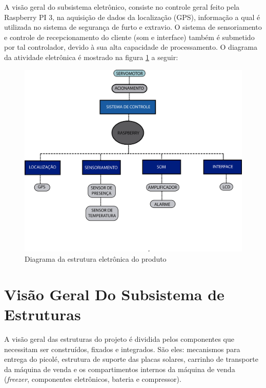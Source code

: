 A visão geral do subsistema eletrônico, consiste no controle geral feito pela Raspberry PI 3, na aquisição de dados da localização (GPS), informação a qual é utilizada no sistema de segurança de furto e extravio. O sistema de sensoriamento e controle de recepcionamento do cliente (som e interface) também é submetido por tal controlador, devido à sua alta capacidade de processamento. O diagrama da atividade eletrônica é mostrado na figura \ref{fig:diagrama} a seguir:

\begin{figure}[H]
	\centering
    
    \includegraphics[width=1.05\textwidth]{figuras/diagrama}
    \caption{Diagrama da estrutura eletrônica do produto}
    \label{fig:diagrama}
\end{figure}


\section{Visão Geral Do Subsistema de Estruturas}

A visão geral das estruturas do projeto é dividida pelos componentes que necessitam ser construídos, fixados e integrados. São eles: mecanismos para entrega do picolé, estrutura de suporte das placas solares, carrinho de transporte da máquina de venda e os compartimentos internos da máquina de venda (\textit{freezer}, componentes eletrônicos, bateria e compressor).

